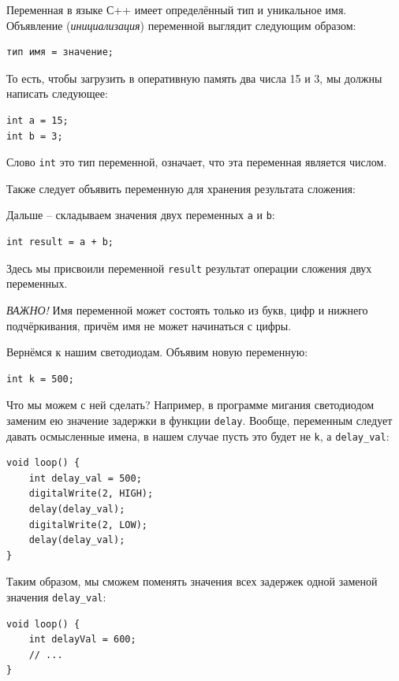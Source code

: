 \documentclass[a4paper,twoside]{book}
\begin{document}
Переменная в языке С++ имеет определённый тип и уникальное имя. Объявление
(\emph{инициализация}) переменной выглядит следующим образом:

\begin{verbatim}
тип имя = значение;
\end{verbatim}

То есть, чтобы загрузить в оперативную память два числа 15 и 3, мы должны написать
следующее:

\begin{verbatim}
int a = 15;
int b = 3;
\end{verbatim}

Слово \texttt{int} это тип переменной, означает, что эта переменная является
числом.

Также следует объявить переменную для хранения результата сложения:

Дальше -- складываем значения двух переменных \texttt{a} и \texttt{b}:

\begin{verbatim}
int result = a + b;
\end{verbatim}

Здесь мы присвоили переменной \texttt{result} результат операции сложения двух
переменных.

\emph{ВАЖНО!} Имя переменной может состоять только из букв, цифр и нижнего
подчёркивания, причём имя не может начинаться с цифры.

Вернёмся к нашим светодиодам. Объявим новую переменную:

\begin{verbatim}
int k = 500;
\end{verbatim}

Что мы можем с ней сделать? Например, в программе мигания светодиодом заменим ею
значение задержки в функции \texttt{delay}. Вообще, переменным следует давать
осмысленные имена, в нашем случае пусть это будет не \texttt{k}, а
\texttt{delay\_val}:

\begin{verbatim}
void loop() {
    int delay_val = 500;
    digitalWrite(2, HIGH);
    delay(delay_val);
    digitalWrite(2, LOW);
    delay(delay_val);
}
\end{verbatim}

Таким образом, мы сможем поменять значения всех задержек одной заменой значения
\texttt{delay\_val}:

\begin{verbatim}
void loop() {
    int delayVal = 600;
    // ...
}
\end{verbatim}
\end{document}
